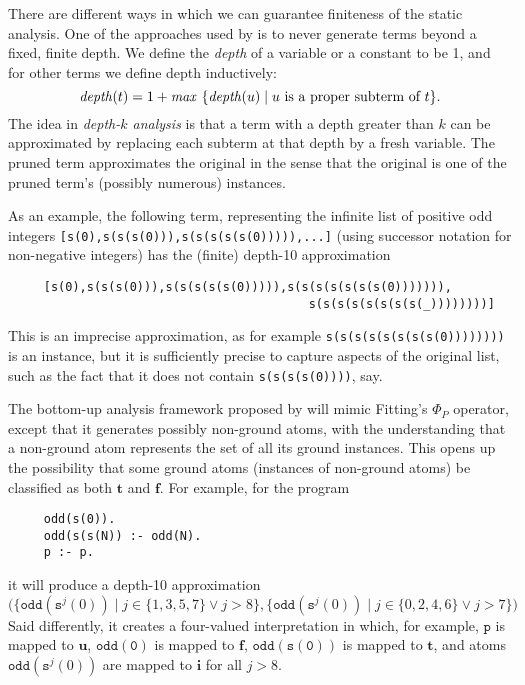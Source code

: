 \documentclass{tlp}
\newcommand{\ident}[1]{\mbox{\textit{#1}}}
\begin{document}
There are different ways in which we can guarantee finiteness of the
static analysis.
One of the approaches used by  is to never
generate terms beyond a fixed, finite depth.
We define the \emph{depth} of a variable or a constant to be 1,
and for other terms we define depth inductively:
\[
  \ident{depth}(t) =
    1 + \ident{max}\ \{\ident{depth}(u) \mid u \mbox{ is a proper subterm of } t\}.
\]
The idea in \emph{depth-$k$ analysis} is that a
term with a depth greater than $k$ can be approximated by replacing
each subterm at that depth by a fresh variable.
The pruned term approximates the original in the sense that the
original is one of the pruned term's (possibly numerous) instances.

As an example, the following term, representing the
infinite list of positive odd integers
    \verb![s(0),s(s(s(0))),s(s(s(s(s(0))))),...]!
(using successor notation for non-negative integers)
has the (finite) depth-10 approximation
\begin{verbatim}
     [s(0),s(s(s(0))),s(s(s(s(s(0))))),s(s(s(s(s(s(s(0))))))),
                                          s(s(s(s(s(s(s(s(_))))))))]
\end{verbatim}
This is an imprecise approximation, as for example \verb!s(s(s(s(s(s(s(s(0))))))))!
is an instance,
but it is sufficiently precise to capture aspects of the original list,
such as the fact that it does not contain \verb!s(s(s(s(0))))!, say.

The bottom-up analysis framework proposed by  
will mimic Fitting's $\Phi_P$ operator, except that
it generates possibly non-ground atoms, with the understanding
that a non-ground atom represents the set of all its ground instances.
This opens up the possibility that some ground atoms (instances of
non-ground atoms) be classified as both $\mathbf{t}$ and $\mathbf{f}$.
For example, for the program
\begin{verbatim}
     odd(s(0)).
     odd(s(s(N)) :- odd(N).
     p :- p.
\end{verbatim}
it will produce a depth-10 approximation
\[
 \big( 
  \{\mathtt{odd}(\mathtt{s}^j(0)) \mid j \in \{1,3,5,7\} \lor j > 8\},
  \{\mathtt{odd}(\mathtt{s}^j(0)) \mid j \in \{0,2,4,6\} \lor j > 7\}
 \big)
\]
Said differently, it creates a four-valued interpretation in which,
for example,
$\mathtt{p}$ is mapped to $\mathbf{u}$, 
$\mathtt{odd(0)}$ is mapped to $\mathbf{f}$, 
$\mathtt{odd(s(0))}$ is mapped to $\mathbf{t}$, 
and atoms $\mathtt{odd}(\mathtt{s}^j(0))$ are mapped to 
$\mathbf{i}$ for all $j>8$.
\end{document}
